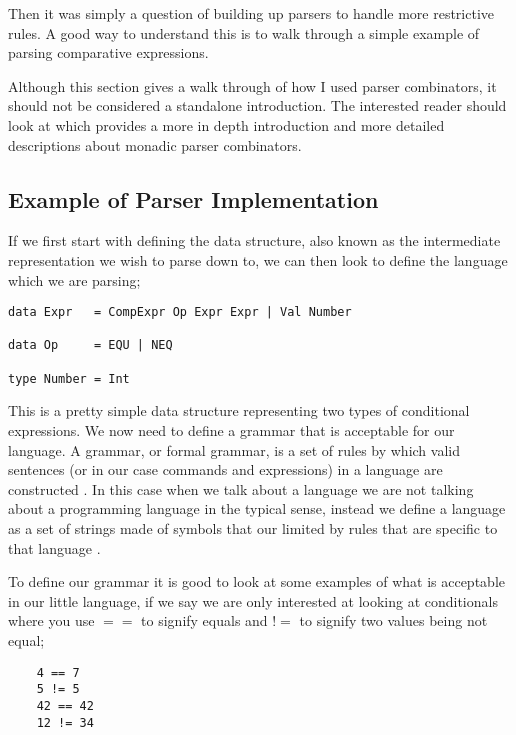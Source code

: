 Then it was simply a question of building up parsers to handle more restrictive rules. A good way to understand this is to walk through a simple example of parsing comparative expressions. 

Although this section gives a walk through of how I used parser combinators, it should not be considered a standalone introduction. The interested reader should look at %
which provides a more in depth introduction and more detailed descriptions about monadic parser combinators.

\newpage

\subsection{Example of Parser Implementation}

If we first start with defining the data structure, also known as the intermediate representation we wish to parse down to, we can then look to define the language which we are parsing;

\begin{lstlisting}
data Expr 	= CompExpr Op Expr Expr | Val Number
	
data Op		= EQU | NEQ 
	
type Number	= Int 
\end{lstlisting}

This is a pretty simple data structure representing two types of conditional expressions. We now need to define a grammar that is acceptable for our language. A grammar, or formal grammar, is a set of rules by which valid sentences (or in our case commands and expressions) in a language are constructed \footnotemark[1].  In this case when we talk about a language we are not talking about a programming language in the typical sense, instead we define a language as a set of strings made of symbols that our limited by rules that are specific to that language \footnotemark[2]. 


To define our grammar it is good to look at some examples of what is acceptable in our little language, if we say we are only interested at looking at conditionals where you use $==$ to signify equals and $!=$ to signify two values being not equal;

\begin{lstlisting}
	4 == 7
	5 != 5
	42 == 42
	12 != 34 
\end{lstlisting}

